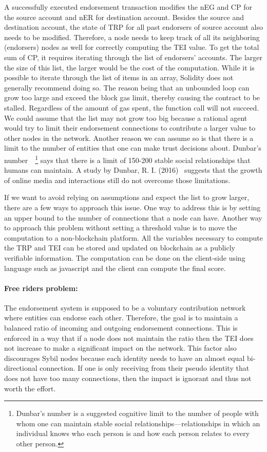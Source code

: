 A successfully executed endorsement transaction modifies the \ac{nEG} and
\ac{CP} for the source account and \ac{nER} for destination account. Besides
the source and destination account, the state of \ac{TRP} for all past
endorsers of source account also needs to be modified. Therefore, a node needs
to keep track of all its neighboring (endorsers) nodes as well for correctly
computing the \ac{TEI} value. To get the total sum of \ac{CP}, it requires
iterating through the list of endorsers' accounts. The larger the size of this
list, the larger would be the cost of the computation. While it is possible to
iterate through the list of items in an array, Solidity does not generally
recommend doing so. The reason being that an unbounded loop can grow too large
and exceed the block gas limit, thereby causing the contract to be stalled.
Regardless of the amount of gas spent, the function call will not succeed. We
could assume that the list may not grow too big because a rational agent would
try to limit their endorsement connections to contribute a larger value to
other nodes in the network. Another reason we can assume so is that there is a
limit to the number of entities that one can make trust decisions about.
Dunbar's number~\cite{hill2003social}~\footnote{Dunbar's number is a suggested
	cognitive limit to the number of people with whom one can maintain stable
	social relationships—relationships in which an individual knows who each
	person is and how each person relates to every other person.} says that
	there is a limit of 150-200 stable social relationships that humans can
	maintain. A study by Dunbar, R. I. (2016)~\cite{dunbar2016online} suggests
	that the growth of online media and interactions still do not overcome
	those limitations. \par 
If we want to avoid relying on assumptions and expect the list to grow larger,
there are a few ways to approach this issue. One way to address this is by
setting an upper bound to the number of connections that a node can have.
Another way to approach this problem without setting a threshold value is to
move the computation to a non-blockchain platform. All the variables necessary
to compute the \ac{TRP} and \ac{TEI} can be stored and updated on blockchain as
a publicly verifiable information. The computation can be done on the
client-side using language such as javascript and the client can compute the
final score.  
\paragraph{Free riders problem:} The endorsement system is supposed to be a
voluntary contribution network where entities can endorse each other.
Therefore, the goal is to maintain a balanced ratio of incoming and outgoing
endorsement connections. This is enforced in a way that if a node does not
maintain the ratio then the \ac{TEI} does not increase to make a significant
impact on the network. This factor also discourages Sybil nodes because each
identity needs to have an almost equal bi-directional connection. If one is
only receiving from their pseudo identity that does not have too many
connections, then the impact is ignorant and thus not worth the effort.
